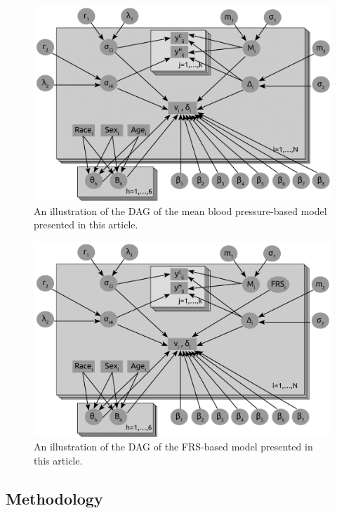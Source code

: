 \documentclass[
]{article}
\begin{document}
\begin{figure}
\hypertarget{fig:DAGmean}{%
\centering
\includegraphics{./DAG_Mean.png}
\caption{An illustration of the DAG of the mean blood pressure-based
model presented in this article.}\label{fig:DAGmean}
}
\end{figure}

\begin{figure}
\hypertarget{fig:DAGFRS}{%
\centering
\includegraphics{./DAG_FRS.png}
\caption{An illustration of the DAG of the FRS-based model presented in
this article.}\label{fig:DAGFRS}
}
\end{figure}

\hypertarget{methodology}{%
\subsection{Methodology}\label{methodology}}
\end{document}

